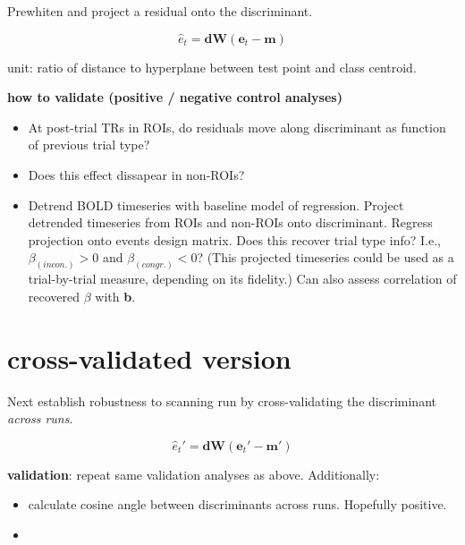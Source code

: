 \documentclass{article}\usepackage[]{graphicx}\usepackage[]{color}
\begin{document}
Prewhiten and project a residual onto the discriminant.

\[\hat{e}_t = \mathbf{d} \mathbf{W} (\mathbf{e}_t - \mathbf{m})\]


unit: ratio of distance to hyperplane between test point and class centroid.

\textbf{how to validate (positive / negative control analyses)}
\begin{itemize}
  \item At post-trial TRs in ROIs, do residuals move along discriminant as function of previous trial type?
  \item Does this effect dissapear in non-ROIs?
  \item Detrend BOLD timeseries with baseline model of regression.
  Project detrended timeseries from ROIs and non-ROIs onto discriminant.
  Regress projection onto events design matrix.
  Does this recover trial type info?
  I.e., $\beta_\mathit{(incon.)} > 0$ and $\beta_\mathit{(congr.)} < 0$?
  (This projected timeseries could be used as a trial-by-trial measure, depending on its fidelity.)
  Can also assess correlation of recovered $\beta$ with \textbf{b}.
\end{itemize}

\section*{cross-validated version}

Next establish robustness to scanning run by cross-validating the discriminant \textit{across runs}.

\[\hat{e}_t' = \mathbf{d} \mathbf{W} (\mathbf{e}_t' - \mathbf{m}')\]

\textbf{validation}: repeat same validation analyses as above. Additionally:
\begin{itemize}
  \item calculate cosine angle between discriminants across runs. Hopefully positive.
  \item 
\end{itemize}
\end{document}
